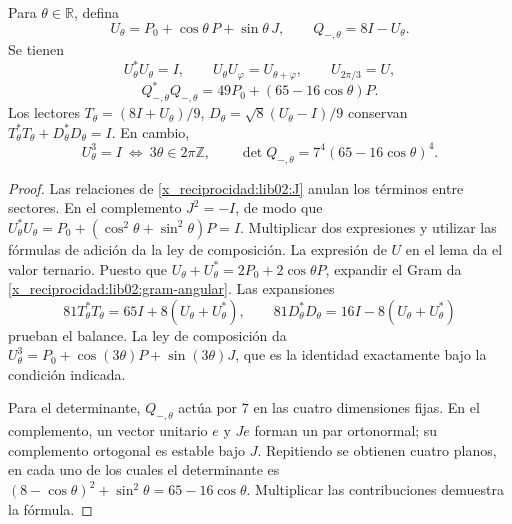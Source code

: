 \begin{theorem}
\label{x_reciprocidad:lib02:Utheta}
Para \(\theta\in\mathbb R\), defina
\[
 U_\theta=P_0+\cos\theta\,P+\sin\theta\,J,\qquad
 Q_{-,\theta}=8I-U_\theta.
\]
Se tienen
\[
 U_\theta^*U_\theta=I,\qquad
 U_\theta U_\varphi=U_{\theta+\varphi},\qquad U_{2\pi/3}=U,
\]
\begin{equation}
 Q_{-,\theta}^*Q_{-,\theta}
 =49P_0+(65-16\cos\theta)P.
 \label{x_reciprocidad:lib02:gram-angular}
\end{equation}
Los lectores
\(T_\theta=(8I+U_\theta)/9\),
\(D_\theta=\sqrt8(U_\theta-I)/9\) conservan
\(T_\theta^*T_\theta+D_\theta^*D_\theta=I\). En cambio,
\[
 U_\theta^3=I\ \Longleftrightarrow\ 3\theta\in2\pi\mathbb Z,
 \qquad
 \det Q_{-,\theta}=7^4(65-16\cos\theta)^4.
\]
\end{theorem}
\begin{proof}
Las relaciones de \cref{x_reciprocidad:lib02:J} anulan los términos entre sectores.
En el complemento \(J^2=-I\), de modo que
\(U_\theta^*U_\theta=P_0+(\cos^2\theta+\sin^2\theta)P=I\).
Multiplicar dos expresiones y utilizar las fórmulas de adición da la
ley de composición. La expresión de \(U\) en el lema da el valor
ternario. Puesto que
\(U_\theta+U_\theta^*=2P_0+2\cos\theta P\), expandir el
Gram da \eqref{x_reciprocidad:lib02:gram-angular}. Las expansiones
\[
 81T_\theta^*T_\theta=65I+8(U_\theta+U_\theta^*),\qquad
 81D_\theta^*D_\theta=16I-8(U_\theta+U_\theta^*)
\]
prueban el balance. La ley de composición da
\(U_\theta^3=P_0+\cos(3\theta)P+\sin(3\theta)J\), que es
la identidad exactamente bajo la condición indicada.

Para el determinante, \(Q_{-,\theta}\) actúa por 7 en las cuatro
dimensiones fijas. En el complemento, un vector unitario \(e\) y
\(Je\) forman un par ortonormal; su complemento ortogonal es estable
bajo \(J\). Repitiendo se obtienen cuatro planos, en cada uno de los
cuales el determinante es
\((8-\cos\theta)^2+\sin^2\theta=65-16\cos\theta\).
Multiplicar las contribuciones demuestra la fórmula.
\end{proof}

